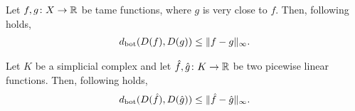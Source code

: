 \begin{lemma}
    Let $ f, g \colon X \to \mathbb R $ be tame functions, where $ g $ is very close to $ f $. Then, following holds,
    \begin{align}
        d_{\operatorname{bot}}(D(f), D(g)) \leq \|f - g \|_\infty.
    \end{align}
\end{lemma}

\begin{lemma}
    Let $ K $ be a simplicial complex and let $ \hat f, \hat g \colon K \to \mathbb R $ be two picewise linear functions. Then, following holds,
    \begin{align}
        d_{\operatorname{bot}}(D(\hat f), D(\hat g)) \leq \|\hat f - \hat g \|_\infty.
    \end{align}
\end{lemma}